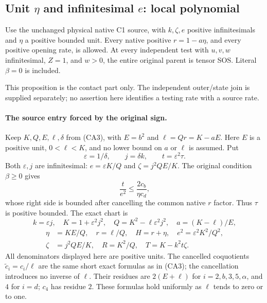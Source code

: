 \subsection{Unit $\eta$ and infinitesimal $e$: local polynomial}

\label{component:pa7e744614f49}

\begin{proposition}
Use the unchanged physical native C1 source, with $k,\zeta,e$ positive
infinitesimals and $\eta$ a positive bounded unit. Every native positive
$r=1-a\eta$, and every positive opening rate, is allowed.
At every independent test with $u,v,w$ infinitesimal, $Z=1$, and $w>0$,
the entire original parent is tensor SOS. Literal $\beta=0$ is included.
\end{proposition}
This proposition is the contact part only. The independent outer/state
join is supplied separately; no assertion here identifies a testing rate
with a source rate.

\paragraph{The source entry forced by the original sign.}
Keep $K,Q,E,\ell,\delta$ from (CA3), with $E=b^2$ and
$\ell=Qr=K-aE$. Here $E$ is a positive unit, $0<\ell<K$, and no lower
bound on $a$ or $\ell$ is assumed. Put
\[
 \varepsilon=1/\delta,\qquad j=\delta k,\qquad t=\varepsilon^2\tau.
\]
Both $\varepsilon,j$ are infinitesimal: $e=\varepsilon K/Q$ and
$\zeta=j^2QE/K$. The original condition $\beta\ge0$ gives
\[
 \frac{t}{e^2}\le\frac{2c_b}{\eta c_d},
\]
whose right side is bounded after cancelling the common native $r$
factor. Thus $\tau$ is positive bounded. The exact chart is
\[
 k=\varepsilon j,\quad K=1+\varepsilon^2j^2,\quad
 Q=K^2-\ell\varepsilon^2j^2,\quad a=(K-\ell)/E,
\]
\begin{align*}
 \eta&=KE/Q,\quad r=\ell/Q,\quad H=r+\eta,\quad
 e^2=\varepsilon^2K^2/Q^2,\\
 \zeta&=j^2QE/K,\quad R=K^2/Q,\quad T=K-k^2t\zeta. \tag{SE1}
\end{align*}
All denominators displayed here are positive units. The cancelled
coquotients $\widetilde c_i=c_i/\ell$ are the same short exact formulas
as in (CA3); the cancellation introduces no inverse of $\ell$.
Their residues are $2(E+\ell)$ for $i=2,b,3,5,\alpha$, and $4$ for
$i=d$; $c_4$ has residue $2$. These formulas hold uniformly as
$\ell$ tends to zero or to one.

